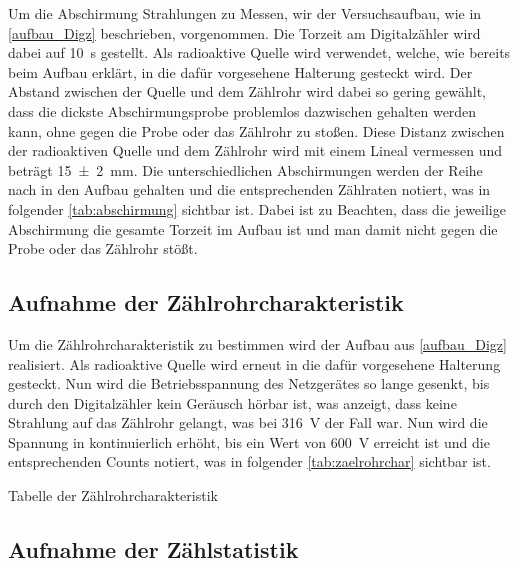 \documentclass[12pt,english,ngerman]{scrartcl}
\begin{document}
Um die Abschirmung Strahlungen zu Messen, wir der Versuchsaufbau, wie in \autoref{aufbau_Digz} beschrieben, vorgenommen. 
Die Torzeit am Digitalzähler wird dabei auf \SI{10}{\second} gestellt. Als radioaktive Quelle wird  verwendet, welche, wie 
bereits beim Aufbau erklärt, in die dafür vorgesehene Halterung gesteckt wird. Der Abstand zwischen der Quelle und dem Zählrohr
wird dabei so gering gewählt, dass die dickste Abschirmungsprobe problemlos dazwischen gehalten werden kann, ohne gegen
die Probe oder das Zählrohr zu stoßen. Diese Distanz zwischen der radioaktiven Quelle und dem Zählrohr wird mit einem Lineal
vermessen und beträgt \SI{15(2)}{\mm}. Die unterschiedlichen Abschirmungen werden der Reihe nach in den Aufbau gehalten und die 
entsprechenden Zählraten notiert, was in folgender \autoref{tab:abschirmung} sichtbar ist. Dabei ist zu Beachten, dass die 
jeweilige Abschirmung die gesamte Torzeit im Aufbau ist und man damit nicht gegen die Probe oder das Zählrohr stößt.


\subsection{Aufnahme der Zählrohrcharakteristik}

Um die Zählrohrcharakteristik zu bestimmen wird der Aufbau aus \autoref{aufbau_Digz} realisiert.
Als radioaktive Quelle wird erneut  in die dafür vorgesehene Halterung gesteckt. Nun wird die Betriebsspannung des
Netzgerätes so lange gesenkt, bis durch den Digitalzähler kein Geräusch hörbar ist, was anzeigt, dass keine Strahlung auf das 
Zählrohr gelangt, was bei \SI{316}{\volt} der Fall war. Nun wird die Spannung in kontinuierlich erhöht, bis ein Wert von 
\SI{600}{\volt} erreicht ist und die entsprechenden Counts
notiert, was in folgender \autoref{tab:zaelrohrchar} sichtbar ist.

\begin{table}
  \caption{Tabelle der Zählrohrcharakteristik}
  \label{tab:zaelrohrchar}
  \begin{center}
    
  \end{center}
\end{table}



\subsection{Aufnahme der Zählstatistik}
\end{document}
